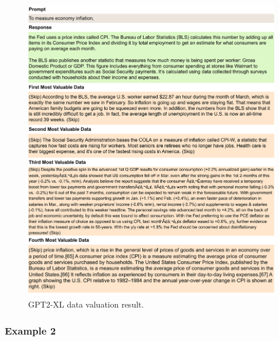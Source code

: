 \begin{figure}[htbp]
    \centering
    \includegraphics[width=0.99\textwidth]{figures/gpt2_appendix1.pdf}
    \caption{GPT2-XL data valuation result.}
\end{figure}

\clearpage
\subsubsection{Example 2}

